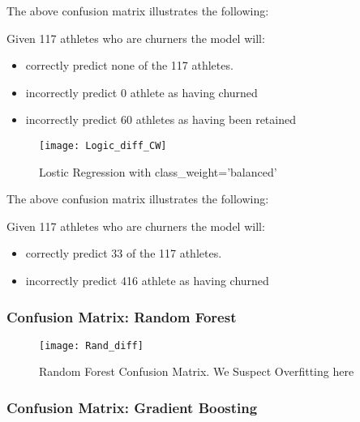 \documentclass[
10pt, %
a4paper, %
oneside, %
headinclude,footinclude, %
BCOR5mm, %
]{scrartcl}
\begin{document}
The above confusion matrix illustrates the following: 

Given 117 athletes who are churners the model will:

\begin{itemize}
\item correctly predict none of the 117 athletes. 
\item incorrectly predict 0 athlete as having churned 
\item incorrectly predict 60 athletes as having been retained 
\end{itemize}

\begin{figure}[H]
\centering 
\texttt{[image: Logic\_diff\_CW]} 
\caption[Lostic Regression Confusion Matrix]{Lostic Regression with class\_weight='balanced'} %
\label{fig:gallery} 
\end{figure}

The above confusion matrix illustrates the following: 

Given 117 athletes who are churners the model will:

\begin{itemize}
\item correctly predict 33 of the 117 athletes. 
\item incorrectly predict 416 athlete as having churned 
\end{itemize}

\subsubsection{\textbf{Confusion Matrix}: Random Forest}

\begin{figure}[H]
\centering 
\texttt{[image: Rand\_diff]} 
\caption[Lostic Regression Confusion Matrix]{Random Forest Confusion Matrix. We Suspect Overfitting here} %
\label{fig:gallery} 
\end{figure}

\subsubsection{\textbf{Confusion Matrix}: Gradient Boosting}
\end{document}
